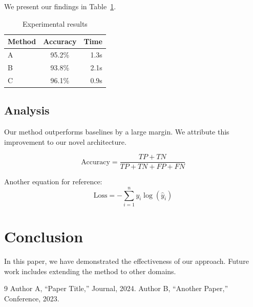 \documentclass{article}
\begin{document}
We present our findings in Table~\ref{tab:results}.

\begin{table}[h]
\centering
\begin{tabular}{lcr}
  \hline
  Method  & Accuracy & Time \\
  \hline
   A  &  95.2\%  &  1.3s \\
    B &   93.8\% &   2.1s \\
   C  &   96.1\%  &   0.9s \\
  \hline
\end{tabular}
  \caption{  Experimental results  }
\label{tab:results}
\end{table}

  \subsection{Analysis}

  Our method outperforms baselines by a large margin.
  We attribute this improvement to our novel architecture.

\begin{equation}
  \text{Accuracy} = \frac{TP + TN}{TP + TN + FP + FN}
\end{equation}

  Another equation for reference:
  \begin{equation}
    \text{Loss} = -\sum_{i=1}^{n} y_i \log(\hat{y}_i)
  \end{equation}

  \section{Conclusion}

    In this paper, we have demonstrated the effectiveness of our approach.
    Future work includes extending the method to other domains.

  \begin{thebibliography}{9}
     Author A, ``Paper Title,'' Journal, 2024.
      Author B, ``Another Paper,'' Conference, 2023.
  \end{thebibliography}
\end{document}
